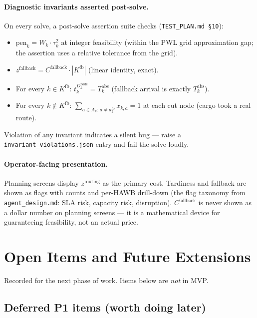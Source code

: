 \documentclass[11pt,a4paper]{article}
\theoremstyle{definition}
\begin{document}
\paragraph{Diagnostic invariants asserted post-solve.}
On every solve, a post-solve assertion suite checks
(\texttt{TEST\_PLAN.md \S10}):
\begin{itemize}[noitemsep]
  \item $\text{pen}_k = W_k \cdot \tau_k^2$ at integer feasibility (within
        the PWL grid approximation gap; the assertion uses a relative
        tolerance from the grid).
  \item $z^{\text{fallback}} = C^{\text{fallback}} \cdot |K^{\text{fb}}|$
        (linear identity, exact).
  \item For every $k \in K^{\text{fb}}$: $t_k^{D_k^{\text{node}}} =
        T_k^{\text{abs}}$ (fallback arrival is exactly $T_k^{\text{abs}}$).
  \item For every $k \notin K^{\text{fb}}$: $\sum_{a \in A_k :\, a \neq
        a^{\text{fb}}_k} x_{k,a} = 1$ at each cut node (cargo took a real
        route).
\end{itemize}
Violation of any invariant indicates a silent bug --- raise a
\texttt{invariant\_violations.json} entry and fail the solve loudly.

\paragraph{Operator-facing presentation.}
Planning screens display $z^{\text{routing}}$ as the primary cost. Tardiness
and fallback are shown as flags with counts and per-HAWB drill-down (the
flag taxonomy from \texttt{agent\_design.md}: SLA risk, capacity risk,
disruption). $C^{\text{fallback}}$ is never shown as a dollar number on
planning screens --- it is a mathematical device for guaranteeing
feasibility, not an actual price.

\section{Open Items and Future Extensions}
\label{sec:deferred}

Recorded for the next phase of work. Items below are \emph{not} in MVP.

\subsection*{Deferred P1 items (worth doing later)}
\end{document}
